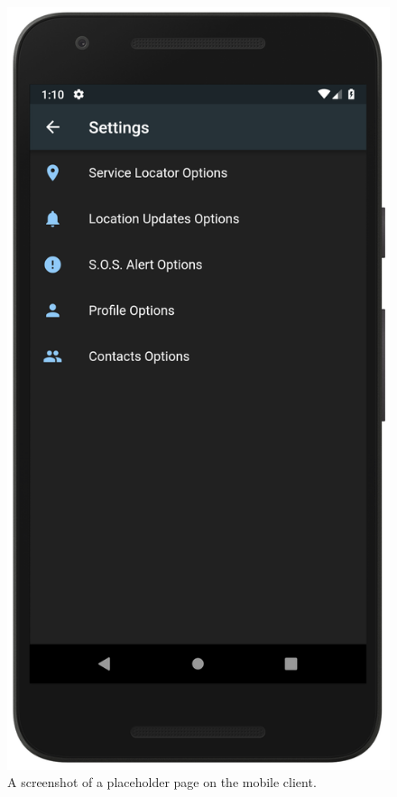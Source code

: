 \documentclass[10pt, a4paper]{article}
\begin{document}
\begin{figure}[!htb]
  \includegraphics[width=\linewidth]{demo_settings.png}
  \caption{A screenshot of a placeholder page on the mobile client.}\label{fig:mobile3}
\endminipage
\end{figure}
\end{document}
